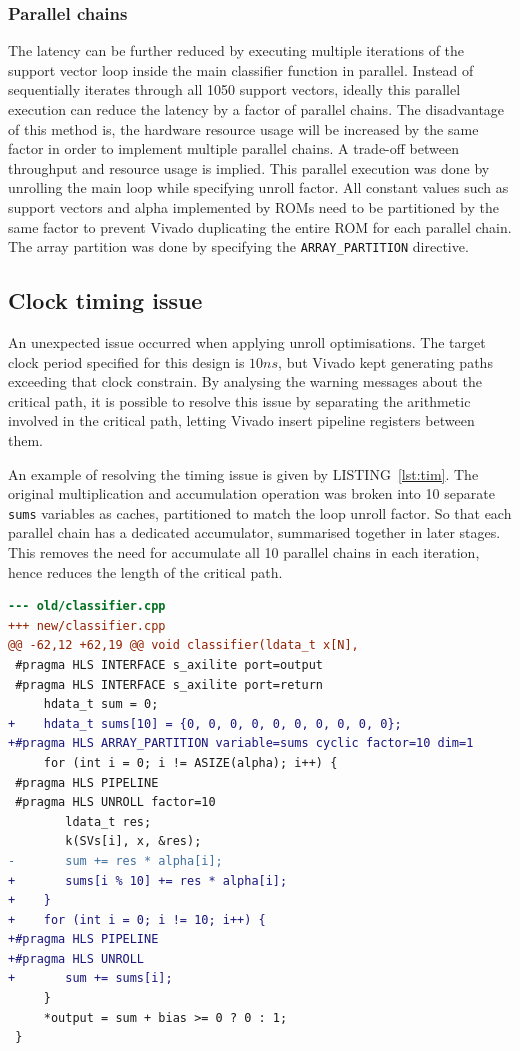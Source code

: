 \documentclass[journal]{IEEEtran}
\newcommand{\lref}[1]{LISTING~\ref{#1}}
\newcommand{\improvi}[1]{\improv[inline]{#1}}
\begin{document}
\subsubsection{Parallel chains}

The latency can be further reduced by executing multiple iterations of the support vector loop inside the main classifier function in parallel. Instead of sequentially iterates through all 1050 support vectors, ideally this parallel execution can reduce the latency by a factor of parallel chains.
The disadvantage of this method is, the hardware resource usage will be increased by the same factor in order to implement multiple parallel chains. A trade-off between throughput and resource usage is implied.
This parallel execution was done by unrolling the main loop while specifying unroll factor. All constant values such as support vectors and alpha implemented by ROMs need to be partitioned by the same factor to prevent Vivado duplicating the entire ROM for each parallel chain. The array partition was done by specifying the \texttt{ARRAY\_PARTITION} directive.

\improvi{Insert codes?}

\subsection{Clock timing issue}

An unexpected issue occurred when applying unroll optimisations. The target clock period specified for this design is $10 ns$, but Vivado kept generating paths exceeding that clock constrain. By analysing the warning messages about the critical path, it is possible to resolve this issue by separating the arithmetic involved in the critical path, letting Vivado insert pipeline registers between them.

An example of resolving the timing issue is given by \lref{lst:tim}. The original multiplication and accumulation operation was broken into 10 separate \texttt{sums} variables as caches, partitioned to match the loop unroll factor. So that each parallel chain has a dedicated accumulator, summarised together in later stages. This removes the need for accumulate all 10 parallel chains in each iteration, hence reduces the length of the critical path.

\begin{lstlisting}[language=diff,caption={Code modification to resolve timing issue},captionpos=b,label=lst:tim]
--- old/classifier.cpp
+++ new/classifier.cpp
@@ -62,12 +62,19 @@ void classifier(ldata_t x[N],
 #pragma HLS INTERFACE s_axilite port=output
 #pragma HLS INTERFACE s_axilite port=return
     hdata_t sum = 0;
+    hdata_t sums[10] = {0, 0, 0, 0, 0, 0, 0, 0, 0, 0};
+#pragma HLS ARRAY_PARTITION variable=sums cyclic factor=10 dim=1
     for (int i = 0; i != ASIZE(alpha); i++) {
 #pragma HLS PIPELINE
 #pragma HLS UNROLL factor=10
        ldata_t res;
        k(SVs[i], x, &res);
-       sum += res * alpha[i];
+       sums[i % 10] += res * alpha[i];
+    }
+    for (int i = 0; i != 10; i++) {
+#pragma HLS PIPELINE
+#pragma HLS UNROLL
+       sum += sums[i];
     }
     *output = sum + bias >= 0 ? 0 : 1;
 }
\end{lstlisting}
\end{document}
